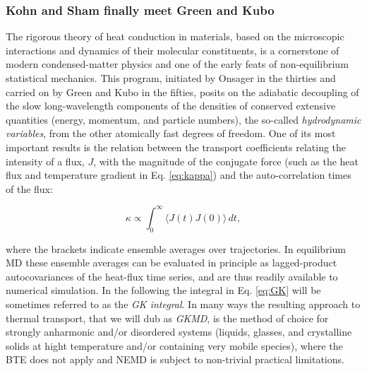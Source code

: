 \subsubsection*{Kohn and Sham finally meet Green and Kubo}
The rigorous theory of heat conduction in materials, based on the microscopic interactions and dynamics of their molecular constituents, is a cornerstone of modern condensed-matter physics and one of the early feats of non-equilibrium statistical mechanics.\cite{Kubo1991} This program, initiated by Onsager in the thirties\cite{Onsager1931a,Onsager1931b} and carried on by Green\cite{Green1952,Green1954} and Kubo\cite{Kubo1957a,Kubo1957b} in the fifties, posits on the adiabatic decoupling of the slow long-wavelength components of the densities of conserved extensive quantities (energy, momentum, and particle numbers),\cite{Kadanoff1963} the so-called \emph{hydrodynamic variables}, from the other atomically fast degrees of freedom. One of its most important results is the relation between the transport coefficients relating the intensity of a flux, $J$, with the magnitude of the conjugate force (such as the heat flux and temperature gradient in Eq. \ref{eq:kappa}) and the auto-correlation times of the flux: 
\begin{linenomath}\begin{equation}
\kappa\propto\int_{0}^{\infty}\!\langle{J}(t){J}(0)\rangle\, dt,\label{eq:GK}
\end{equation}\end{linenomath}
where the brackets indicate ensemble averages over trajectories. In equilibrium MD these ensemble averages can be evaluated in principle as lagged-product autocovariances of the heat-flux time series, and are thus readily available to numerical simulation. In the following the integral in Eq. \eqref{eq:GK} will be sometimes referred to as the \emph{GK integral}. In many ways the resulting approach to thermal transport, that we will dub as \emph{GKMD}, is the method of choice for strongly anharmonic and/or disordered systems (liquids, glasses, and crystalline solids at hight temperature and/or containing very mobile species), where the BTE does not apply and NEMD is subject to non-trivial practical limitations. 

